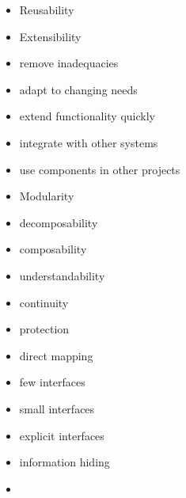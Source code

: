 \begin{itemize}
    \item Reusability
    \item Extensibility
    \item remove inadequacies
    \item adapt to changing needs
    \item extend functionality quickly
    \item integrate with other systems
    \item use components in other projects
    \item Modularity
    \item decomposability
    \item composability
    \item understandability
    \item continuity
    \item protection
    \item direct mapping
    \item few interfaces
    \item small interfaces
    \item explicit interfaces
    \item information hiding
    \item 
\end{itemize}
